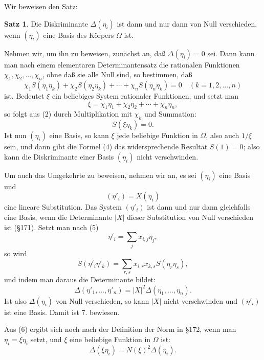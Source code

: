 \documentclass[12pt,a4paper]{article}
\theoremstyle{definition}
\newtheorem{satz}{Satz}[section]
\begin{document}
Wir beweisen den Satz:

\begin{satz}
Die Diskriminante $\Delta(\eta_i)$ ist dann und nur dann von Null verschieden, wenn $(\eta_i)$ eine Basis des Körpers $\Omega$ ist.
\end{satz}

Nehmen wir, um ihn zu beweisen, zunächst an, daß $\Delta(\eta_i) = 0$ sei. Dann kann man nach einem elementaren Determinantensatz die rationalen Funktionen $\chi_1, \chi_2, \ldots, \chi_n$, ohne daß sie alle Null sind, so bestimmen, daß
\begin{equation}
\chi_1 S(\eta_1\eta_k) + \chi_2 S(\eta_2\eta_k) + \cdots + \chi_n S(\eta_n\eta_k) = 0 \quad (k = 1, 2, \ldots, n)
\end{equation}
ist. Bedeutet $\xi$ ein beliebiges System rationaler Funktionen, und setzt man
\begin{equation}
\xi = \chi_1\eta_1 + \chi_2\eta_2 + \cdots + \chi_n\eta_n,
\end{equation}
so folgt aus (2) durch Multiplikation mit $\chi_k$ und Summation:
\begin{equation}
S(\xi\eta_k) = 0.
\end{equation}
Ist nun $(\eta_i)$ eine Basis, so kann $\xi$ jede beliebige Funktion in $\Omega$, also auch $1/\xi$ sein, und dann gibt die Formel (4) das widersprechende Resultat $S(1) = 0$; also kann die Diskriminante einer Basis $(\eta_i)$ nicht verschwinden.

Um auch das Umgekehrte zu beweisen, nehmen wir an, es sei $(\eta_i)$ eine Basis und
\begin{equation}
(\eta'_i) = X(\eta_i)
\end{equation}
eine lineare Substitution. Das System $(\eta'_i)$ ist dann und nur dann gleichfalls eine Basis, wenn die Determinante $|X|$ dieser Substitution von Null verschieden ist (\S 171). Setzt man nach (5)
\[\eta'_i = \sum_j x_{i,j}\eta_j,\]
so wird
\[S(\eta'_i\eta'_k) = \sum_{r,s} x_{i,r}x_{k,s}S(\eta_r\eta_s),\]
und indem man daraus die Determinante bildet:
\begin{equation}
\Delta(\eta'_1, \ldots, \eta'_n) = |X|^2 \Delta(\eta_1, \ldots, \eta_n).
\end{equation}
Ist also $\Delta(\eta_i)$ von Null verschieden, so kann $|X|$ nicht verschwinden und $(\eta'_i)$ ist eine Basis. Damit ist 7. bewiesen.

Aus (6) ergibt sich noch nach der Definition der Norm in \S 172, wenn man $\eta_i = \xi\eta_i$ setzt, und $\xi$ eine beliebige Funktion in $\Omega$ ist:
\begin{equation}
\Delta(\xi\eta_i) = N(\xi)^2 \Delta(\eta_i).
\end{equation}
\end{document}
